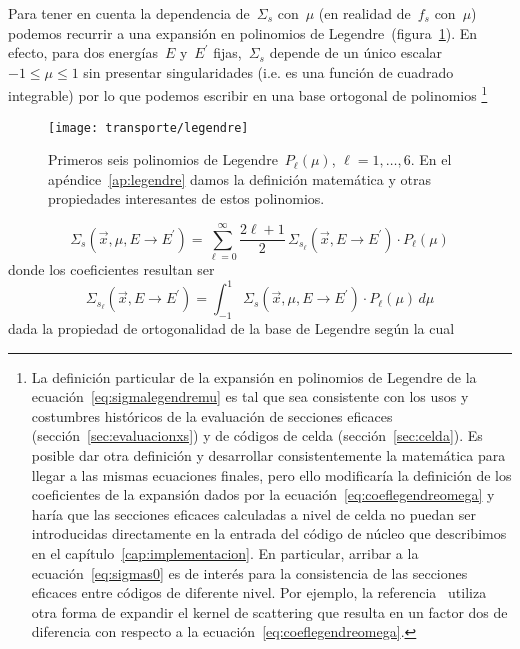 \medskip

Para tener en cuenta la dependencia de~$\Sigma_s$ con~$\mu$ (en realidad de~$f_s$ con~$\mu$) podemos recurrir a una expansión en polinomios de Legendre~(figura~\ref{fig:legendre}). En efecto, para dos energías~$E$ y~$E^\prime$ fijas,~$\Sigma_s$ depende de un único escalar~$-1 \leq \mu \leq 1$ sin presentar singularidades (i.e. es una función de cuadrado integrable) por lo que podemos escribir en una base ortogonal de polinomios%
%
\footnote{La definición particular de la expansión en polinomios de Legendre de la ecuación~\eqref{eq:sigmalegendremu} es tal que sea consistente con los usos y costumbres históricos de la evaluación de secciones eficaces (sección~\ref{sec:evaluacionxs}) y de códigos de celda (sección~\ref{sec:celda}). Es posible dar otra definición y desarrollar consistentemente la matemática para llegar a las mismas ecuaciones finales, pero ello modificaría la definición de los coeficientes de la expansión dados por la ecuación~\eqref{eq:coeflegendreomega} y haría que las secciones eficaces calculadas a nivel de celda no puedan ser introducidas directamente en la entrada del código de núcleo que describimos en el capítulo~\ref{cap:implementacion}. En particular, arribar a la ecuación~\eqref{eq:sigmas0} es de interés para la consistencia de las secciones eficaces entre códigos de diferente nivel. Por ejemplo, la referencia~\cite{lewis} utiliza otra forma de expandir el kernel de scattering que resulta en un factor dos de diferencia con respecto a la ecuación~\eqref{eq:coeflegendreomega}.}

\begin{figure}[bt]
\begin{center}
\texttt{[image: transporte/legendre]}
\end{center}
\caption{\label{fig:legendre}Primeros seis polinomios de Legendre~$P_\ell(\mu)$, $\ell = 1,\dots,6$. En el apéndice~\ref{ap:legendre} damos la definición matemática y otras propiedades interesantes de estos polinomios.}
\end{figure}

\begin{equation}\label{eq:sigmalegendremu}
\Sigma_s(\vec{x}, \mu, E \rightarrow E^\prime) = \sum_{\ell=0}^{\infty} \frac{2\ell + 1}{2} \, \Sigma_{s_\ell}(\vec{x}, E \rightarrow E^{\prime}) \cdot P_\ell(\mu)  
\end{equation}
%
donde los coeficientes resultan ser
\begin{equation}\label{eq:coeflegendremu} 
 \Sigma_{s_\ell}(\vec{x}, E\rightarrow E^{\prime}) =
 \int_{-1}^{1} \Sigma_s(\vec{x}, \mu, E\rightarrow E^\prime) \cdot P_\ell(\mu) \, d\mu 
\end{equation}
%
dada la propiedad de ortogonalidad de la base de Legendre según la cual

